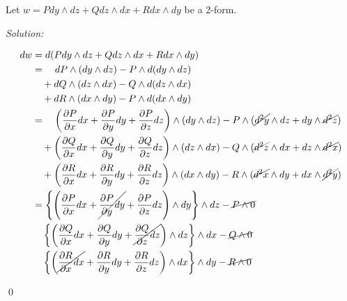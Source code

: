 \documentclass[12pt]{article}
\theoremstyle{definition}
\newenvironment{problem}[2][Problem]{\begin{trivlist}
\item[\hskip \labelsep {\bfseries #1}\hskip \labelsep {\bfseries #2.}]}{\end{trivlist}}
\newenvironment{sol}
{\emph{Solution:}
}
{
    \qed
    }
\begin{document}




\begin{problem}{1}
    Let $w=P dy \wedge dz + Q dz \wedge dx + R dx \wedge dy$ be a 2-form.
\end{problem}

\begin{sol}
    \begin{align*}
        dw &=     d(P dy \wedge dz + Q dz \wedge dx + R dx \wedge dy) \\
           &= \quad dP \wedge (dy \wedge dz) - P \wedge d(dy \wedge dz) \\
           &\quad + dQ \wedge (dz \wedge dx) - Q \wedge d(dz \wedge dx) \\
           &\quad + dR \wedge (dx \wedge dy) - P \wedge d(dx \wedge dy) \\
           &= \quad \left(\frac{\partial{P}}{\partial{x}}dx+\frac{\partial{P}}{\partial{y}}dy+\frac{\partial{P}}{\partial{z}}dz\right) \wedge (dy \wedge dz) - P \wedge (\cancel{d^{2}y} \wedge dz + dy \wedge \cancel{d^{2}z}) \\
           &\quad + \left(\frac{\partial{Q}}{\partial{x}}dx+\frac{\partial{Q}}{\partial{y}}dy+\frac{\partial{Q}}{\partial{z}}dz\right) \wedge (dz \wedge dx) - Q \wedge (\cancel{d^{2}z} \wedge dx + dz \wedge \cancel{d^{2}x}) \\
           &\quad + \left(\frac{\partial{R}}{\partial{x}}dx+\frac{\partial{R}}{\partial{y}}dy+\frac{\partial{R}}{\partial{z}}dz\right) \wedge (dx \wedge dy) - R \wedge (\cancel{d^{2}x} \wedge dy + dx \wedge \cancel{d^{2}y}) \\
           &=     \left\{ \left(\frac{\partial{P}}{\partial{x}}dx + \cancel{\frac{\partial{P}}{\partial{y}}dy} + \frac{\partial{P}}{\partial{z}}dz\right) \wedge dy \right\} \wedge dz - \cancel{P \wedge 0} \\
           &\quad \left\{ \left(\frac{\partial{Q}}{\partial{x}}dx + \frac{\partial{Q}}{\partial{y}}dy + \cancel{\frac{\partial{Q}}{\partial{z}}dz}\right) \wedge dz \right\} \wedge dx - \cancel{Q \wedge 0} \\
           &\quad \left\{ \left(\cancel{\frac{\partial{R}}{\partial{x}}dx} + \frac{\partial{R}}{\partial{y}}dy + \frac{\partial{R}}{\partial{z}}dz\right) \wedge dx \right\} \wedge dy - \cancel{R \wedge 0} \\

\end{align*}
\end{sol}
\end{document}
